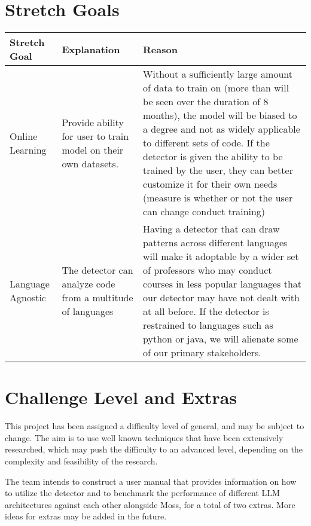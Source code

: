 \documentclass{article}
\begin{document}
\section{Stretch Goals}

\begin{center}
  \hspace*{-1cm}
  \begin{tabular}{ 
    | p{3cm} 
    | p{6cm} 
    | p{6cm} | }
  \hline
   Stretch Goal & 
  Explanation & 
  Reason \\
  \hline
  Online Learning & 
  Provide ability for user to train model on their own datasets. & 
  Without a sufficiently large amount of data to train on (more than will be seen over the duration of 8 months), the model will be biased to a degree and not as widely applicable to different sets of code. If the detector is given the ability to be trained by the user, they can better customize it for their own needs (measure is whether or not the user can change conduct training)\\
  \hline
  Language Agnostic & 
  The detector can analyze code from a multitude of languages & 
  Having a detector that can draw patterns across different languages will make it adoptable by a wider set of professors who may conduct courses in less popular languages that our detector may have not dealt with at all before. If the detector is restrained to languages such as python or java, we will alienate some of our primary stakeholders.\\
  \hline
  \end{tabular}
  \end{center}

\section{Challenge Level and Extras}
This project has been assigned a difficulty level of general, and may be subject
to change. The aim is to use well known techniques that have been extensively
researched, which may push the difficulty to an advanced level, depending on the
complexity and feasibility of the research. 


The team intends to construct a user manual that provides information on how to 
utilize the detector and to benchmark the performance of different LLM
architectures against each other alongside Moss, for a total of two extras. More 
ideas for extras may be added in the future.

\end{document}
